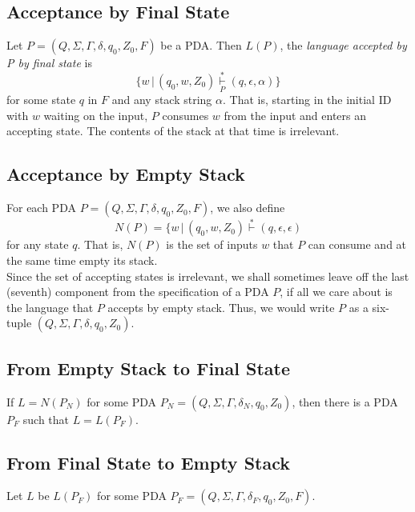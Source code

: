 \documentclass[]{article}
\begin{document}
  \subsection*{Acceptance by Final State}
    Let $P = (Q,\Sigma,\Gamma,\delta,q_0,Z_0,F)$ be a PDA. Then $L(P)$, the
    \emph{language accepted by P by final state} is
      \[
        \{ w \, | \, (q_0,w,Z_0)\overset{*}{\underset{P}{\vdash}}(q,\epsilon,
        \alpha)\}
      \]
    for some state $q$ in $F$ and any stack string $\alpha$. That is, starting
    in the initial ID with $w$ waiting on the input, $P$ consumes $w$ from the
    input and enters an accepting state. The contents of the stack at that time
    is irrelevant.

  \subsection*{Acceptance by Empty Stack}
    For each PDA $P = (Q,\Sigma,\Gamma,\delta,q_0,Z_0,F)$, we also define
      \[
        N(P) = \{ w \, | \, (q_0,w,Z_0) \overset{*}{\vdash}(q,\epsilon,
        \epsilon)
      \]
    for any state $q$. That is, $N(P)$ is the set of inputs $w$ that $P$ can
    consume and at the same time empty its stack. \\
    \indent Since the set of accepting states is irrelevant, we shall sometimes
    leave off the last (seventh) component from the specification of a PDA $P$,
    if all we care about is the language that $P$ accepts by empty stack. Thus,
    we would write $P$ as a six-tuple $(Q,\Sigma,\Gamma,\delta,q_0,Z_0)$.

  \subsection*{From Empty Stack to Final State}
    \begin{thm}
      If $L = N(P_N)$ for some PDA $P_N = (Q,\Sigma,\Gamma,\delta_N,q_0,Z_0)$,
      then there is a PDA $P_F$ such that $L = L(P_F)$.
    \end{thm}

  \subsection*{From Final State to Empty Stack}
    \begin{thm}
      Let $L$ be $L(P_F)$ for some PDA
      $P_F = (Q,\Sigma,\Gamma,\delta_F,q_0,Z_0,F)$.
    \end{thm}
\end{document}
